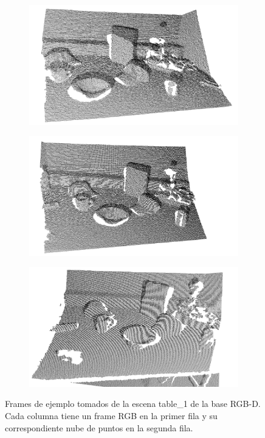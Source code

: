 \begin{figure}[t]
    \begin{subfigure}[b]{0.3\textwidth}
        \includegraphics[width=\textwidth]{img/escena_rgbd/table_1_27_pcd.png}
    \end{subfigure}
    \quad
    \begin{subfigure}[b]{0.3\textwidth}
        \includegraphics[width=\textwidth]{img/escena_rgbd/table_1_34_pcd.png}
    \end{subfigure}
    \quad
    \begin{subfigure}[b]{0.3\textwidth}
        \includegraphics[width=\textwidth]{img/escena_rgbd/table_1_48_pcd.png}
    \end{subfigure}

    \caption{Frames de ejemplo tomados de la escena table\_1 de la base RGB-D. Cada columna tiene un frame RGB en la primer fila y su correspondiente nube de puntos en la segunda fila.}
    \label{fig:escena_rgbd_base}
\end{figure}

